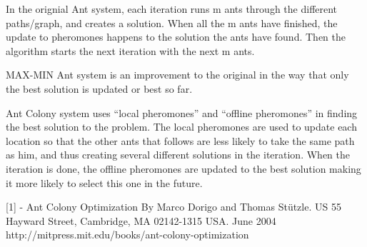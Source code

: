 In the orignial Ant system, each iteration runs m ants through the different paths/graph, and creates a solution. When all the m ants have finished, the update to pheromones happens to the solution the ants have found. Then the algorithm starts the next iteration with the next m ants.

MAX-MIN Ant system is an improvement to the original in the way that only the best solution is updated or best so far.

Ant Colony system uses “local pheromones” and “offline pheromones” in finding the best solution to the problem. The local pheromones are used to update each location so that the other ants that follows are less likely to take the same path as him, and thus creating several different solutions in the iteration. When the iteration is done, the offline pheromones are updated to the best solution making it more likely to select this one in the future.

[1] - Ant Colony Optimization By Marco Dorigo and Thomas Stützle. US 55 Hayward Street, Cambridge, MA 02142-1315 USA. June 2004   http://mitpress.mit.edu/books/ant-colony-optimization

